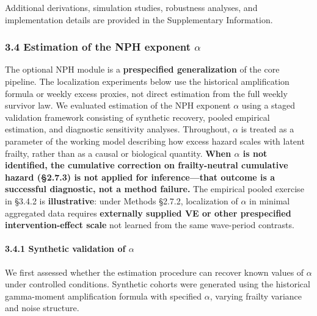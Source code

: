 \documentclass[
]{article}
\begin{document}
Additional derivations, simulation studies, robustness analyses, and implementation details are provided in the Supplementary Information.

\subsubsection{\texorpdfstring{3.4 Estimation of the NPH exponent \(\alpha\)}{3.4 Estimation of the NPH exponent \textbackslash alpha}}\label{estimation-of-the-nph-exponent-alpha}

The optional NPH module is a \textbf{prespecified generalization} of the core pipeline. The localization experiments below use the historical amplification formula or weekly excess proxies, not direct estimation from the full weekly survivor law. We evaluated estimation of the NPH exponent \(\alpha\) using a staged validation framework consisting of synthetic recovery, pooled empirical estimation, and diagnostic sensitivity analyses. Throughout, \(\alpha\) is treated as a parameter of the working model describing how excess hazard scales with latent frailty, rather than as a causal or biological quantity. \textbf{When \(\alpha\) is not identified, the cumulative correction on frailty-neutral cumulative hazard (§2.7.3) is not applied for inference---that outcome is a successful diagnostic, not a method failure.} The empirical pooled exercise in §3.4.2 is \textbf{illustrative}: under Methods §2.7.2, localization of \(\alpha\) in minimal aggregated data requires \textbf{externally supplied VE or other prespecified intervention-effect scale} not learned from the same wave-period contrasts.

\paragraph{\texorpdfstring{3.4.1 Synthetic validation of \(\alpha\)}{3.4.1 Synthetic validation of \textbackslash alpha}}\label{synthetic-validation-of-alpha}

We first assessed whether the estimation procedure can recover known values of \(\alpha\) under controlled conditions. Synthetic cohorts were generated using the historical gamma-moment amplification formula with specified \(\alpha\), varying frailty variance and noise structure.
\end{document}
